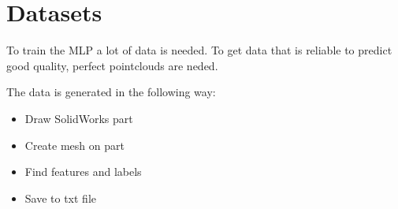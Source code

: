 \section{Datasets}

To train the MLP a lot of data is needed. To get data that is reliable to predict good quality, perfect pointclouds are neded.

The data is generated in the following way:
\begin{itemize}
    \item Draw SolidWorks part
    \item Create mesh on part
    \item Find features and labels
    \item Save to txt file
\end{itemize}


